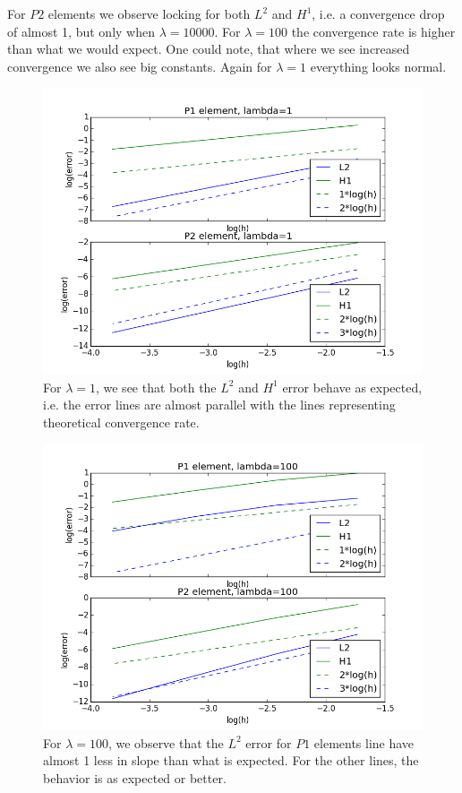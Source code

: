 \documentclass[11pt,a4paper]{report}
\begin{document}
\\
\\
For $P2$ elements we observe locking for both $L^2$ and $H^1$, i.e. a convergence drop of almost 1, but only when $\lambda=10000$. For $\lambda=100$ the convergence rate is higher than what we would expect. One could note, that where we see increased convergence we also see big constants. Again for $\lambda=1$ everything looks normal. 
\begin{figure}
  \includegraphics[width=\linewidth]{l1.png}
  \caption{For $\lambda =1$, we see that both the $L^2$ and $H^1$ error behave as expected, i.e. the error lines are almost parallel with the lines representing theoretical convergence rate.}
  \label{Fig 3}
\end{figure}


\begin{figure}
  \includegraphics[width=\linewidth]{l100.png}
  \caption{For $\lambda =100$, we observe that the $L^2$ error for $P1$ elements line have almost 1 less in slope than what is expected. For the other lines, the behavior is as expected or better. }
  \label{Fig 4}
\end{figure}
\end{document}
